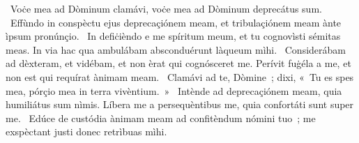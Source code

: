 ~Voċe mea ad Dòminum clamávi, voċe mea ad Dòminum deprecátus sum. 
~Effùndo in conspèctu ejus deprecaçiónem meam, et tribulaçiónem meam ànte ìpsum pronúnçio. 
~In defiċièndo e me spíritum meum, et tu cognovìsti sémitas meas. In via hac qua ambulábam absconduérunt làqueum mìhi. 
~Considerábam ad dèxteram, et vidébam, et non èrat qui cognósceret me. Perívit fuġéla a me, et non est qui requírat ànimam meam. 
~Clamávi ad te, Dòmine~; dixi, «~Tu es spes mea, pórçio mea in terra vivèntium.~»
~Intènde ad deprecaçiónem meam, quia humiliátus sum nìmis. Líbera me a persequèntibus me, quia confortáti sunt super me. 
~Edúce de custódia ànimam meam ad confitèndum nómini tuo~; me exspèctant justi donec retrìbuas mìhi. 
